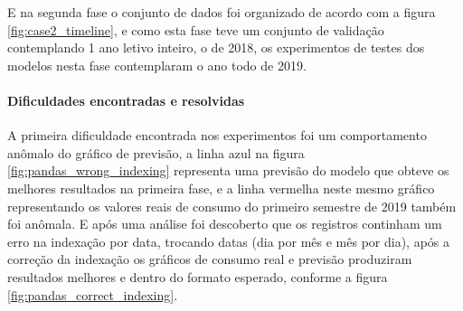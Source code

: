     \begin{figure}[htb]
        \end{figure}
    E na segunda fase o conjunto de dados foi organizado de acordo com a figura \ref{fig:case2_timeline}, e como esta fase teve um conjunto de validação contemplando 1 ano letivo inteiro, o de 2018, os experimentos de testes dos modelos nesta fase contemplaram o ano todo de 2019.
    
    \begin{figure}[H]
        \end{figure}
   
    \paragraph{Dificuldades encontradas e resolvidas}
    A primeira dificuldade encontrada nos experimentos foi um comportamento anômalo do gráfico de previsão, a linha azul na figura \ref{fig:pandas_wrong_indexing} representa uma previsão do modelo que obteve os melhores resultados na primeira fase, e a linha vermelha neste mesmo gráfico representando os valores reais de consumo do primeiro semestre de 2019 também foi anômala. E após uma análise foi descoberto que os registros continham um erro na indexação por data, trocando datas (dia por mês e mês por dia), após a correção da indexação os gráficos de consumo real e previsão produziram resultados melhores e dentro do formato esperado, conforme a figura \ref{fig:pandas_correct_indexing}.
    
